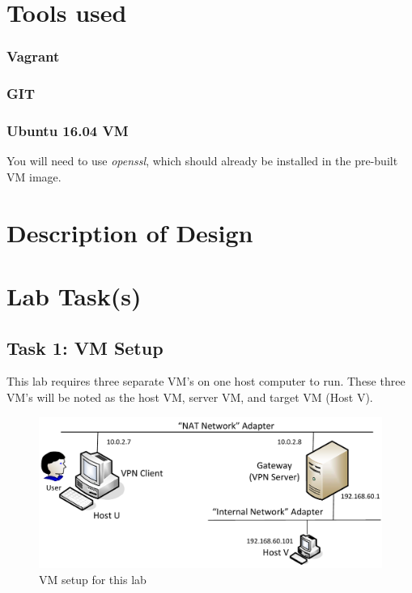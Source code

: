 \documentclass[12pt]{article}
\begin{document}
\section{Tools used}
\subsubsection{Vagrant}
\subsubsection{GIT}
\subsubsection{Ubuntu 16.04 VM}

You will need to use \textit{openssl}, which should already be installed in the pre-built VM image.

\section{Description of Design}






\section{Lab Task(s)}
\subsection{Task 1: VM Setup}
This lab requires three separate VM's on one host computer to run. These three VM's will be noted as the host VM, server VM, and target VM (Host V).
\begin{figure}[H]
    \begin{center}
        \includegraphics[scale=0.35]{t1_1.png}
    \end{center}{}
    \caption{VM setup for this lab}
    \label{fig:t1_1}
\end{figure}
\end{document}
